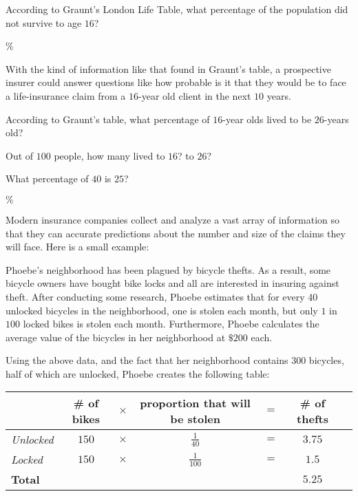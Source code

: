 \documentclass{ximera}
\begin{document}
\begin{question}
According to Graunt's London Life Table, what percentage of the population did not survive to age $16$?
\begin{solution}
\%
\end{solution}	
\end{question}

With the kind of information like that found in Graunt's table, a prospective insurer could answer questions like how probable is it that they would be to face a life-insurance claim from a $16$-year old client in the next $10$ years.

\begin{question}
According to Graunt's table, what percentage of $16$-year olds lived to be $26$-years old?
\begin{solution}
\begin{hint}
Out of $100$ people, how many lived to $16$? to $26$?
\end{hint}
\begin{hint}
What percentage of $40$ is $25$? 
\end{hint}
$\%$
\end{solution}	
\end{question}

Modern insurance companies collect and analyze a vast array of information so that they can accurate predictions about the number and size of the claims they will face. Here is a small example:

Phoebe's neighborhood has been plagued by bicycle thefts. As a result, some bicycle owners have bought bike locks and all are interested in insuring against theft. After conducting some research, Phoebe estimates that for every 40 unlocked bicycles in the neighborhood, one is stolen each month, but only $1$ in $100$ locked bikes is stolen each month. Furthermore, Phoebe calculates the average value of the bicycles in her neighborhood at $\$200$ each.

Using the above data, and the fact that her neighborhood contains 300 bicycles, half of which are unlocked, Phoebe creates the following table:

\renewcommand{\arraystretch}{2}
\begin{center}
\begin{tabular}{@{}lcccccc@{}}
 & \# of bikes & $\times$ & proportion that will be stolen & $=$ & \# of thefts\\\midrule
\textit{Unlocked} & $150$ & $\times$ & $\frac{1}{40}$ & $=$  & $3.75$\\
\textit{Locked} & $150$ & $\times$ & $\frac{1}{100}$ & $=$ & $1.5$\\\bottomrule
\textbf{Total} & & & & & \textbf{$5.25$}
\end{tabular}
\end{center}
\end{document}
